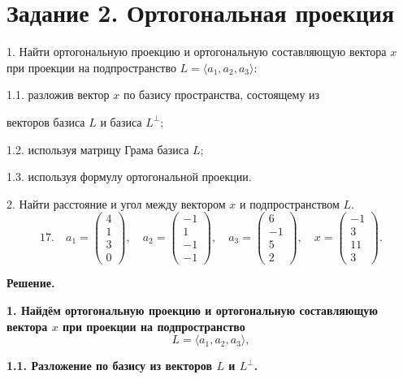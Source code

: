 \section{Задание 2. Ортогональная проекция}

1. Найти ортогональную проекцию и ортогональную составляющую вектора $x$ при проекции на подпространство $L=\langle a_1,a_2,a_3\rangle$:

\hspace*{\parindent}1.1. разложив вектор $x$ по базису пространства, состоящему из 

векторов базиса $L$ и базиса $L^\perp$;

\hspace*{\parindent}1.2. используя матрицу Грама базиса $L$;

\hspace*{\parindent}1.3. используя формулу ортогональной проекции.

2. Найти расстояние и угол между вектором $x$ и подпространством $L$.
\vspace{0.1cm}
\[
17.\quad
a_1 =
\begin{pmatrix}
4\\
1\\
3\\
0
\end{pmatrix},\quad
a_2 =
\begin{pmatrix}
-1\\
1\\
-1\\
-1
\end{pmatrix},\quad
a_3 =
\begin{pmatrix}
6\\
-1\\
5\\
2
\end{pmatrix},\quad
x =
\begin{pmatrix}
-1\\
3\\
11\\
3
\end{pmatrix}.
\]

\textbf{Решение.}

\textbf{1. Найдём ортогональную проекцию и ортогональную составляющую вектора $x$ при проекции на подпространство}
\[ 
L=\langle a_1,a_2,a_3\rangle,
\]

\textbf{1.1. Разложение по базису из векторов $L$ и $L^\perp$.}

